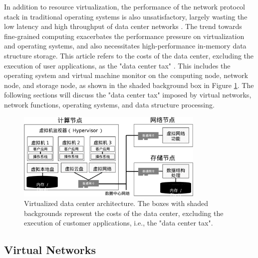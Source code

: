 In addition to resource virtualization, the performance of the network protocol stack in traditional operating systems is also unsatisfactory, largely wasting the low latency and high throughput of data center networks \cite{barroso2017attack}. The trend towards fine-grained computing exacerbates the performance pressure on virtualization and operating systems, and also necessitates high-performance in-memory data structure storage. This article refers to the costs of the data center, excluding the execution of user applications, as the "data center tax" \cite{barroso2018datacenter}. This includes the operating system and virtual machine monitor on the computing node, network node, and storage node, as shown in the shaded background box in Figure \ref{background:fig:virt-architecture}. The following sections will discuss the "data center tax" imposed by virtual networks, network functions, operating systems, and data structure processing.

\begin{figure}[htbp]
	\centering
	\includegraphics[width=0.8\textwidth]{figures/virt_arch.pdf}
	\caption{Virtualized data center architecture. The boxes with shaded backgrounds represent the costs of the data center, excluding the execution of customer applications, i.e., the "data center tax".}
	\label{background:fig:virt-architecture}
\end{figure}

\subsection{Virtual Networks}

